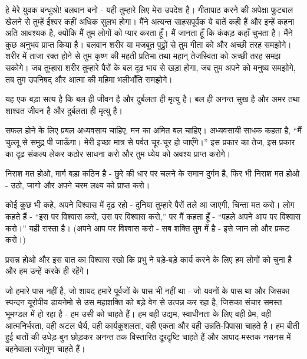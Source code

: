\vskip 2pt

हे मेरे युवक बन्धुओ! बलवान बनो - यही तुम्हारे लिए मेरा उपदेश है। गीतापाठ करने की अपेक्षा फुटबाल खेलने से तुम्हें ईश्वर कहीं अधिक सुलभ होगा। मैंने अत्यन्त साहसपूर्वक ये बातें कही हैं और इन्हें कहना अति आवश्यक है, क्योंकि मैं तुम लोगों को प्यार करता हूँ। मैं जानता हूँ कि कंकड़ कहाँ चुभता है। मैंने कुछ अनुभव प्राप्त किया है। बलवान शरीर या मजबूत पुट्ठों से तुम गीता को और अच्छी तरह समझोगे। शरीर में ताजा रक्त होने से तुम कृष्ण की महती प्रतिभा तथा महान् तेजस्विता को अच्छी तरह समझ सकोगे। जब तुम्हारा शरीर तुम्हारे पैरों के बल दृढ़ भाव से खड़ा होगा, जब तुम अपने को मनुष्य समझोगे, तब तुम उपनिषद् और आत्मा की महिमा भलीभाँति समझोगे। 

\vskip 1.7pt

यह एक बड़ा सत्य है कि बल ही जीवन है और दुर्बलता ही मृत्यु है। बल ही अनन्त सुख है और अमर तथा शाश्वत जीवन है और दुर्बलता ही मृत्यु है। 

\vskip 1.7pt

सफल होने के लिए प्रबल अध्यवसाय चाहिए, मन का अमित बल चाहिए। अध्यवसायी साधक कहता है, “मैं चुल्लू से समुद्र पी जाऊँगा। मेरी इच्छा मात्र से पर्वत चूर-चूर हो जाएँगे।” इस प्रकार का तेज, इस प्रकार का दृढ़ संकल्प लेकर कठोर साधना करो और तुम ध्येय को अवश्य प्राप्त करोगे। 

\vskip 1.7pt

निराश मत होओ, मार्ग बड़ा कठिन है - छुरे की धार पर चलने के समान दुर्गम है, फिर भी निराश मत होओ - उठो, जागो और अपने चरम लक्ष्य को प्राप्त करो। 

\vskip 1.7pt

कोई कुछ भी कहे, अपने विश्वास में दृढ़ रहो - दुनिया तुम्हारे पैरों तले आ जाएगी, चिन्ता मत करो। लोग कहते हैं - “इस पर विश्वास करो, उस पर विश्वास करो,” पर मैं कहता हूँ - “पहले अपने आप पर विश्वास करो।” यही रास्ता है।  (अपने आप पर विश्वास करो - सब शक्ति तुम में है - इसे जान लो और प्रकट करो।) 

\vskip 1.7pt

प्रसन्न होओ और इस बात का विश्वास रखो कि प्रभु ने बड़े-बड़े कार्य करने के लिए हम लोगों को चुना है और हम उन्हें करके ही रहेंगे। 

\vskip 1.7pt

जो हमारे पास नहीं है, जो शायद हमारे पूर्वजों के पास भी नहीं था - जो यवनों के पास था और जिसका स्पन्दन यूरोपीय डायनेमो से उस महाशक्ति को बड़े वेग से उत्पन्न कर रहा है, जिसका संचार समस्त भूमण्डल में हो रहा है - हम उसी को चाहते हैं। हम वही उद्यम, स्वाधीनता के लिए वही प्रेम, वही आत्मनिर्भरता, वही अटल धैर्य, वही कार्यकुशलता, वही एकता और वही उन्नति-पिपासा चाहते है। हम बीती हुई बातों की उधेड़-बुन छोड़कर अनन्त तक विस्तारित दूरदृष्टि चाहते हैं और आपाद-मस्तक नसनस में बहनेवाला रजोगुण चाहते हैं। 

